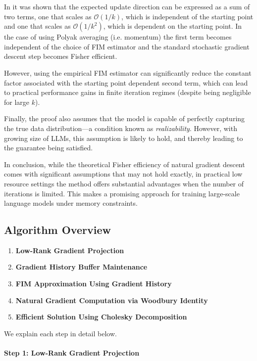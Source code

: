 In \citep{martens2020new} it was shown that the expected update direction can be expressed as a sum of two terms, one that scales as \(\mathcal{O}(1/k)\), which is independent of the starting point and one that scales as \(\mathcal{O}(1/k^2)\), which is dependent on the starting point. In the case of using Polyak averaging (i.e. momentum) the first term becomes independent of the choice of FIM estimator and the standard stochastic gradient descent step becomes Fisher efficient.

However, using the empirical FIM estimator can significantly reduce the constant factor associated with the starting point dependent second term, which can lead to practical performance gains in finite iteration regimes (despite being negligible for large \(k\)).

Finally, the proof \citep{amariNaturalGradientWorks1998} also assumes that the model is capable of perfectly capturing the true data distribution—a condition known as \emph{realizability}. However, with growing size of LLMs, this assumption is likely to hold, and thereby leading to the guarantee being satisfied.

In conclusion, while the theoretical Fisher efficiency of natural gradient descent comes with significant assumptions that may not hold exactly, in practical low resource settings the method offers substantial advantages when the number of iterations is limited. This makes \lowrank{} a promising approach for training large-scale language models under memory constraints.

\subsection{Algorithm Overview}

\begin{enumerate}
    \item \textbf{Low-Rank Gradient Projection}
    \item \textbf{Gradient History Buffer Maintenance}
    \item \textbf{FIM Approximation Using Gradient History}
    \item \textbf{Natural Gradient Computation via Woodbury Identity}
    \item \textbf{Efficient Solution Using Cholesky Decomposition}
\end{enumerate}

We explain each step in detail below.

\paragraph{Step 1: Low-Rank Gradient Projection}

